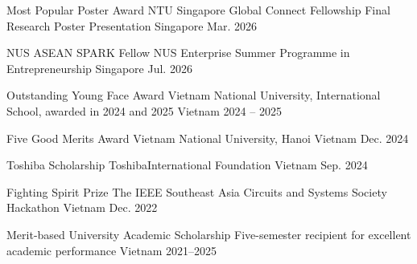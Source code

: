 
\begin{cvhonors}

  \cvhonor
    {Most Popular Poster Award}
    {NTU Singapore Global Connect Fellowship Final Research Poster Presentation}
    {Singapore}
    {Mar. 2026}

  \cvhonor
    {NUS ASEAN SPARK Fellow}
    {NUS Enterprise Summer Programme in Entrepreneurship}
    {Singapore}
    {Jul. 2026}

  \cvhonor
    {Outstanding Young Face Award}
    {Vietnam National University, International School, awarded in 2024 and 2025}
    {Vietnam}
    {2024 -- 2025}

    \cvhonor
    {Five Good Merits Award}
    {Vietnam National University, Hanoi}
    {Vietnam}
    {Dec. 2024}

  \cvhonor
    {Toshiba Scholarship}
    {ToshibaInternational Foundation}
    {Vietnam}
    {Sep. 2024}

    
  \cvhonor
    {Fighting Spirit Prize}
    {The IEEE Southeast Asia Circuits and Systems Society Hackathon}
    {Vietnam}
    {Dec. 2022}

  \cvhonor
    {Merit-based University Academic Scholarship}
    {Five-semester recipient for excellent academic performance}
    {Vietnam}
    {2021--2025}

\end{cvhonors}